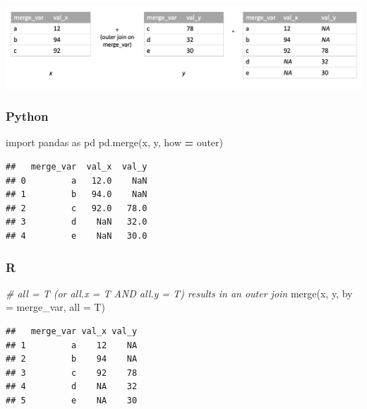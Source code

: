 \documentclass[
]{book}
\newenvironment{Shaded}{\begin{snugshade}}{\end{snugshade}}
\newcommand{\AttributeTok}[1]{\textcolor[rgb]{0.77,0.63,0.00}{#1}}
\newcommand{\CommentTok}[1]{\textcolor[rgb]{0.56,0.35,0.01}{\textit{#1}}}
\newcommand{\FunctionTok}[1]{\textcolor[rgb]{0.00,0.00,0.00}{#1}}
\newcommand{\ImportTok}[1]{#1}
\newcommand{\NormalTok}[1]{#1}
\newcommand{\OperatorTok}[1]{\textcolor[rgb]{0.81,0.36,0.00}{\textbf{#1}}}
\newcommand{\StringTok}[1]{\textcolor[rgb]{0.31,0.60,0.02}{#1}}
\begin{document}
\includegraphics[width=17.25in]{images/outer_join}

\hypertarget{python-37}{%
\subsubsection*{Python}\label{python-37}}

\begin{Shaded}
\begin{Highlighting}[]
\ImportTok{import}\NormalTok{ pandas }\ImportTok{as}\NormalTok{ pd}
\NormalTok{pd.merge(x, y, how }\OperatorTok{=} \StringTok{\textquotesingle{}outer\textquotesingle{}}\NormalTok{)}
\end{Highlighting}
\end{Shaded}

\begin{verbatim}
##   merge_var  val_x  val_y
## 0         a   12.0    NaN
## 1         b   94.0    NaN
## 2         c   92.0   78.0
## 3         d    NaN   32.0
## 4         e    NaN   30.0
\end{verbatim}

\hypertarget{r-37}{%
\subsubsection*{R}\label{r-37}}

\begin{Shaded}
\begin{Highlighting}[]
\CommentTok{\# all = T (or all.x = T AND all.y = T) results in an outer join}
\FunctionTok{merge}\NormalTok{(x, y, }\AttributeTok{by =} \StringTok{\textquotesingle{}merge\_var\textquotesingle{}}\NormalTok{, }\AttributeTok{all =}\NormalTok{ T)}
\end{Highlighting}
\end{Shaded}

\begin{verbatim}
##   merge_var val_x val_y
## 1         a    12    NA
## 2         b    94    NA
## 3         c    92    78
## 4         d    NA    32
## 5         e    NA    30
\end{verbatim}
\end{document}
